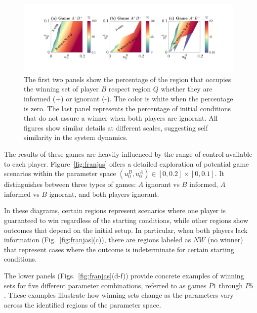 \begin{figure}
    \centering
    \includegraphics[trim={3.1cm 0cm 0cm 0cm}, clip,width=1.12\textwidth  ]{Images/P5/fraccion.png}
    \caption{The first two panels show the percentage of the region that occupies the winning set of player $B$ respect region $Q$ whether they are informed (+) or ignorant (-). The color is white when the percentage is zero. The last panel represents the percentage of initial conditions that do not assure a winner when both players are ignorant. All figures show similar details at different scales, suggesting self similarity in the system dynamics.}
    \label{fig:fraccion}
\end{figure}













The results of these games are heavily influenced by the range of control available to each player. Figure~\ref{fig:franjas} offers a detailed exploration of potential game scenarios within the parameter space $(u_0^B, u_0^A) \in [0,0.2] \times [0,0.1]$. It distinguishes between three types of games:  $A$ ignorant vs $B$ informed, $A$ informed vs $B$ ignorant, and both players ignorant.

In these diagrams, certain regions represent scenarios where one player is guaranteed to win regardless of the starting conditions, while other regions show outcomes that depend on the initial setup. In particular, when both players lack information (Fig.~\ref{fig:franjas}(c)), there are regions labeled as $NW$ (no winner) that represent cases where the outcome is indeterminate for certain starting conditions.

The lower panels (Figs.~\ref{fig:franjas}(d-f)) provide concrete examples of winning sets for five different parameter combinations, referred to as games $P1$ through $P5$. These examples illustrate how winning sets change as the parameters vary across the identified regions of the parameter space.

